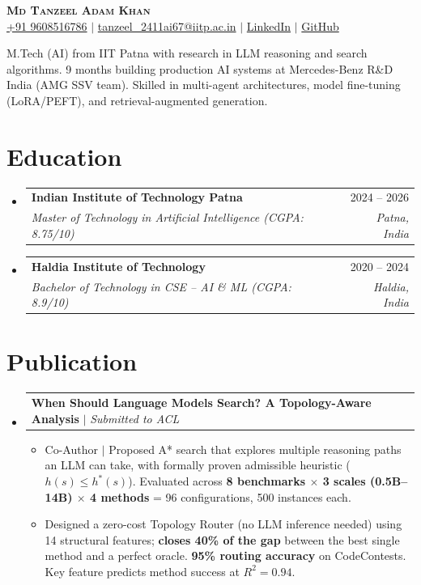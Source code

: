 \documentclass[letterpaper,10pt]{article}
\makeatletter
\newcommand{\resumeItem}[1]{
  \item\small{
    {#1 \vspace{-3pt}}
  }
}
\newcommand{\resumeSubheading}[4]{
  \vspace{-3pt}\item
    \begin{tabular*}{0.97\textwidth}[t]{l@{\extracolsep{\fill}}r}
      \textbf{#1} & #2 \\
      \textit{\small#3} & \textit{\small #4} \\
    \end{tabular*}\vspace{-7pt}
}
\newcommand{\resumeProjectHeading}[2]{
    \item
    \begin{tabular*}{0.97\textwidth}{l@{\extracolsep{\fill}}r}
      \small#1 & #2 \\
    \end{tabular*}\vspace{-7pt}
}
\newcommand{\resumeSubHeadingListStart}{\begin{itemize}[leftmargin=0.15in, label={}]}
\newcommand{\resumeSubHeadingListEnd}{\end{itemize}}
\newcommand{\resumeItemListStart}{\begin{itemize}}
\newcommand{\resumeItemListEnd}{\end{itemize}\vspace{-5pt}}
\makeatother
\begin{document}
\begin{center}
    \textbf{\Huge \scshape Md Tanzeel Adam Khan} \\ \vspace{4pt}
    \small
     \href{tel:9608516786}{+91 9608516786} $|$
     \href{mailto:tanzeel\_2411ai67@iitp.ac.in}{tanzeel\_2411ai67@iitp.ac.in} $|$
     \href{https://www.linkedin.com/in/tanzeel-khan-a4ab76bb/}{LinkedIn} $|$
     \href{https://github.com/tanzeelkhan}{GitHub}
\end{center}
\vspace{-6pt}
\begin{center}
\small{M.Tech (AI) from IIT Patna with research in LLM reasoning and search algorithms. 9 months building production AI systems at Mercedes-Benz R\&D India (AMG SSV team). Skilled in multi-agent architectures, model fine-tuning (LoRA/PEFT), and retrieval-augmented generation.}
\end{center}
\vspace{-8pt}

\section{Education}
\resumeSubHeadingListStart
    \resumeSubheading
    {Indian Institute of Technology Patna}{2024 -- 2026}
    {Master of Technology in Artificial Intelligence (CGPA: 8.75/10)}{Patna, India}
    \resumeSubheading
    {Haldia Institute of Technology}{2020 -- 2024}
    {Bachelor of Technology in CSE -- AI \& ML (CGPA: 8.9/10)}{Haldia, India}
\resumeSubHeadingListEnd

\section{Publication}
\resumeSubHeadingListStart
    \resumeProjectHeading
    {\textbf{When Should Language Models Search? A Topology-Aware Analysis} $|$ \textit{Submitted to ACL}}{}
    \resumeItemListStart
        \resumeItem{Co-Author $|$ Proposed A* search that explores multiple reasoning paths an LLM can take, with formally proven admissible heuristic ($h(s) \leq h^*(s)$). Evaluated across \textbf{8 benchmarks $\times$ 3 scales (0.5B--14B) $\times$ 4 methods} = 96 configurations, 500 instances each.}
        \resumeItem{Designed a zero-cost Topology Router (no LLM inference needed) using 14 structural features; \textbf{closes 40\% of the gap} between the best single method and a perfect oracle. \textbf{95\% routing accuracy} on CodeContests. Key feature predicts method success at $R^2 = 0.94$.}
    \resumeItemListEnd
\resumeSubHeadingListEnd
\end{document}
